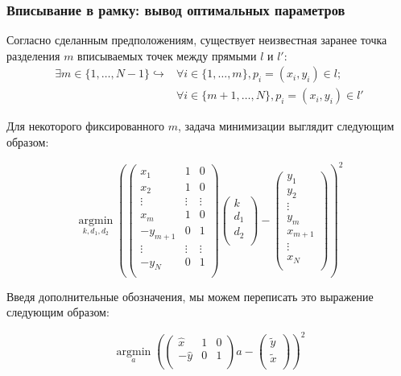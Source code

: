 \begin{frame}
	\frametitle{Вписывание в рамку: вывод оптимальных параметров}
	\small
	Согласно сделанным предположениям, существует неизвестная заранее точка разделения $m$ вписываемых точек между прямыми $l$ и $l'$:
	\begin{align*}
		\exists m \in \{1,\dots,N - 1\}\hookrightarrow& \forall i \in \{1,\dots,m\}, p_i = (x_i, y_i) \in l;\\
		&\forall i \in \{m+1,\dots,N\},p_i = (x_i, y_i) \in l'
	\end{align*}

	Для некоторого фиксированного $m$, задача минимизации выглядит следующим образом:

	\begin{equation*}
		\operatorname*{argmin}_{k, d_1,d_2}\left(\begin{pmatrix}
			x_1 & 1 & 0 \\
			x_2 & 1 & 0 \\
			\vdots & \vdots  & \vdots  \\
			x_{m} & 1 & 0 \\
			-y_{m + 1} & 0 & 1 \\
			\vdots & \vdots  & \vdots  \\
			-y_{N} & 0 & 1 \\
		\end{pmatrix}
		\begin{pmatrix}
			k \\
			d_1\\
			d_2 \\
		\end{pmatrix} - \begin{pmatrix}
			y_1 \\
			y_2\\
			\vdots \\
			y_{m} \\
			x_{m + 1} \\
			\vdots \\
			x_{N} \\
		\end{pmatrix}\right)^2
	\end{equation*}

	Введя дополнительные обозначения, мы можем переписать это выражение следующим образом:

	\begin{equation*}
		\operatorname*{argmin}_{a}\left(\begin{pmatrix}
			\widehat{x} & 1 & 0 \\
			-\widehat{y} & 0 & 1 \\
		\end{pmatrix}
		a - \begin{pmatrix}
			\widetilde{y} \\
			\widetilde{x} \\
		\end{pmatrix}\right)^2
	\end{equation*}


\end{frame}
